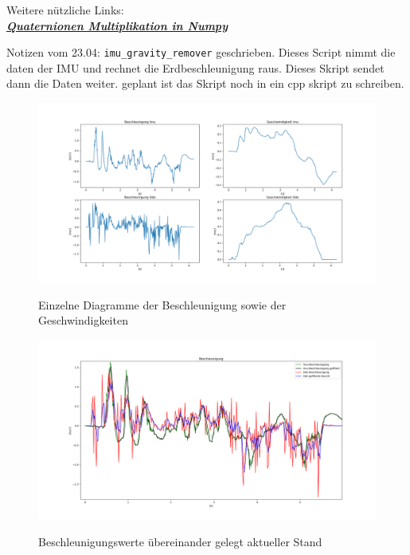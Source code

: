Weitere nützliche Links:\\
\href{https://stackoverflow.com/questions/39000758/how-to-multiply-two-quaternions-by-python-or-numpy}{\emph{\textbf{Quaternionen Multiplikation in Numpy}}}

Notizen vom 23.04:
\lstinline{imu_gravity_remover} geschrieben. Dieses Script nimmt die daten der IMU und rechnet die Erdbeschleunigung raus. Dieses Skript sendet dann die Daten weiter.
geplant ist das Skript noch in ein cpp skript zu schreiben.

\begin{figure}[H]
  \begin{center}
  
    \includegraphics[width=\textwidth]{bilder/23AprImuOdoBeschlGeschw.png}
  \caption{Einzelne Diagramme der Beschleunigung sowie der Geschwindigkeiten}
  \label{fig:diagram1}
  
    \includegraphics[width=\textwidth]{bilder/23AprBeschlOverlap.png}
  \end{center}
  \caption{Beschleunigungswerte übereinander gelegt aktueller Stand}
  \label{fig:diagram2}
\end{figure}

